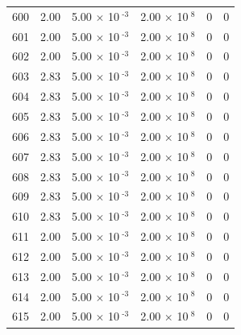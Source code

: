 \documentclass[a4paper,11pt]{article}
\begin{document}
\begin{center}
\begin{longtable}{|R{1.5cm}|R{2.4cm}|R{2.4cm}|R{2.4cm}|R{2.4cm}|R{2.4cm}|}
  600 &   2.00  &         5.00 $\times$ 10$^{\text{          -3}}$  &         2.00 $\times$ 10$^{\text{           8}}$  & 0  & 0 \\
  601 &   2.00  &         5.00 $\times$ 10$^{\text{          -3}}$  &         2.00 $\times$ 10$^{\text{           8}}$  & 0  & 0 \\
  602 &   2.00  &         5.00 $\times$ 10$^{\text{          -3}}$  &         2.00 $\times$ 10$^{\text{           8}}$  & 0  & 0 \\
  603 &   2.83  &         5.00 $\times$ 10$^{\text{          -3}}$  &         2.00 $\times$ 10$^{\text{           8}}$  & 0  & 0 \\
  604 &   2.83  &         5.00 $\times$ 10$^{\text{          -3}}$  &         2.00 $\times$ 10$^{\text{           8}}$  & 0  & 0 \\
  605 &   2.83  &         5.00 $\times$ 10$^{\text{          -3}}$  &         2.00 $\times$ 10$^{\text{           8}}$  & 0  & 0 \\
  606 &   2.83  &         5.00 $\times$ 10$^{\text{          -3}}$  &         2.00 $\times$ 10$^{\text{           8}}$  & 0  & 0 \\
  607 &   2.83  &         5.00 $\times$ 10$^{\text{          -3}}$  &         2.00 $\times$ 10$^{\text{           8}}$  & 0  & 0 \\
  608 &   2.83  &         5.00 $\times$ 10$^{\text{          -3}}$  &         2.00 $\times$ 10$^{\text{           8}}$  & 0  & 0 \\
  609 &   2.83  &         5.00 $\times$ 10$^{\text{          -3}}$  &         2.00 $\times$ 10$^{\text{           8}}$  & 0  & 0 \\
  610 &   2.83  &         5.00 $\times$ 10$^{\text{          -3}}$  &         2.00 $\times$ 10$^{\text{           8}}$  & 0  & 0 \\
  611 &   2.00  &         5.00 $\times$ 10$^{\text{          -3}}$  &         2.00 $\times$ 10$^{\text{           8}}$  & 0  & 0 \\
  612 &   2.00  &         5.00 $\times$ 10$^{\text{          -3}}$  &         2.00 $\times$ 10$^{\text{           8}}$  & 0  & 0 \\
  613 &   2.00  &         5.00 $\times$ 10$^{\text{          -3}}$  &         2.00 $\times$ 10$^{\text{           8}}$  & 0  & 0 \\
  614 &   2.00  &         5.00 $\times$ 10$^{\text{          -3}}$  &         2.00 $\times$ 10$^{\text{           8}}$  & 0  & 0 \\
  615 &   2.00  &         5.00 $\times$ 10$^{\text{          -3}}$  &         2.00 $\times$ 10$^{\text{           8}}$  & 0  & 0 \\

\end{longtable}
\end{center}
\end{document}
